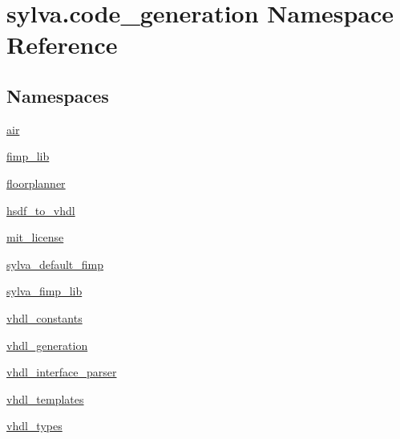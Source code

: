 \hypertarget{namespacesylva_1_1code__generation}{}\section{sylva.\+code\+\_\+generation Namespace Reference}
\label{namespacesylva_1_1code__generation}
\subsection*{Namespaces}
\begin{DoxyCompactItemize}
\item 
 \hyperlink{namespacesylva_1_1code__generation_1_1air}{air}
\item 
 \hyperlink{namespacesylva_1_1code__generation_1_1fimp__lib}{fimp\+\_\+lib}
\item 
 \hyperlink{namespacesylva_1_1code__generation_1_1floorplanner}{floorplanner}
\item 
 \hyperlink{namespacesylva_1_1code__generation_1_1hsdf__to__vhdl}{hsdf\+\_\+to\+\_\+vhdl}
\item 
 \hyperlink{namespacesylva_1_1code__generation_1_1mit__license}{mit\+\_\+license}
\item 
 \hyperlink{namespacesylva_1_1code__generation_1_1sylva__default__fimp}{sylva\+\_\+default\+\_\+fimp}
\item 
 \hyperlink{namespacesylva_1_1code__generation_1_1sylva__fimp__lib}{sylva\+\_\+fimp\+\_\+lib}
\item 
 \hyperlink{namespacesylva_1_1code__generation_1_1vhdl__constants}{vhdl\+\_\+constants}
\item 
 \hyperlink{namespacesylva_1_1code__generation_1_1vhdl__generation}{vhdl\+\_\+generation}
\item 
 \hyperlink{namespacesylva_1_1code__generation_1_1vhdl__interface__parser}{vhdl\+\_\+interface\+\_\+parser}
\item 
 \hyperlink{namespacesylva_1_1code__generation_1_1vhdl__templates}{vhdl\+\_\+templates}
\item 
 \hyperlink{namespacesylva_1_1code__generation_1_1vhdl__types}{vhdl\+\_\+types}
\end{DoxyCompactItemize}
